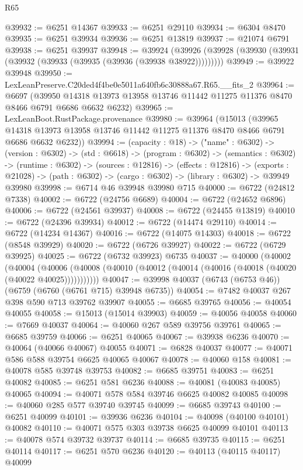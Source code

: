 \begin{lexlean}{R65}
\begin{coremodule}
{@39932 := @6251 @14367
@39933 := @6251 @29110
@39934 := @6304 @8470
@39935 := @6251 @39934
@39936 := @6251 @13819
@39937 := @21074 @6791
@39938 := @6251 @39937
@39948 := @39924
    (@39926 (@39928 (@39930 (@39931 (@39932 (@39933 (@39935 (@39936 (@39938 @38922)))))))))
@39949 := @39922 @39948
@39950 := LexLeanPreserve.C20ded4f4be0e5011a640fb6c30888a67.R65.__fits_2
@39964 := @6697
    (@39950 @14318 @13973 @13958 @13746 @11442 @11275 @11376 @8470 @8466 @6791 @6686 @6632 @6232)
@39965 := LexLeanBoot.RustPackage.provenance
@39980 := @39964
    (@15013
      (@39965 @14318 @13973 @13958 @13746 @11442 @11275 @11376 @8470 @8466 @6791 @6686 @6632 @6232))
@39994 := (capacity : @18) ->
  ("name" : @6302) ->
  (version : @6302) ->
  (std : @6618) ->
  (program : @6302) ->
  (semantics : @6302) ->
  (runtime : @6302) ->
  (sources : @12816) ->
  (effects : @12816) ->
  (exports : @21028) -> (path : @6302) -> (cargo : @6302) -> (library : @6302) -> @39949 @39980
@39998 := @6714 @46 @39948 @39980 @715
@40000 := @6722 (@24812 @7338)
@40002 := @6722 (@24756 @6689)
@40004 := @6722 (@24652 @6896)
@40006 := @6722 (@24561 @39937)
@40008 := @6722 (@24455 @13819)
@40010 := @6722 (@24396 @39934)
@40012 := @6722 (@14474 @29110)
@40014 := @6722 (@14234 @14367)
@40016 := @6722 (@14075 @14303)
@40018 := @6722 (@8548 @39929)
@40020 := @6722 (@6726 @39927)
@40022 := @6722 (@6729 @39925)
@40025 := @6722 (@6732 @39923) @6735
@40037 := @40000
    (@40002
      (@40004
        (@40006 (@40008 (@40010 (@40012 (@40014 (@40016 (@40018 (@40020 (@40022 @40025)))))))))))
@40047 := @39998 @40037 (@6743 (@6753 @46)) (@6759 (@6760 (@6761 @715) @39948 @6735))
@40054 := @7482 @40037 @267 @398 @590 @713 @39762 @39907
@40055 := @6685 @39765
@40056 := @40054 @40055
@40058 := @15013 (@15014 @39903)
@40059 := @40056 @40058
@40060 := @7669 @40037
@40064 := @40060 @267 @589 @39756 @39761
@40065 := @6685 @39759
@40066 := @6251 @40065
@40067 := @39938 @6236
@40070 := @40064 (@40066 @40067) @40055
@40071 := @6828 @40037
@40077 := @40071 @586 @588 @39754 @6625 @40065 @40067
@40078 := @40060 @158
@40081 := @40078 @585 @39748 @39753
@40082 := @6685 @39751
@40083 := @6251 @40082
@40085 := @6251 @581 @6236
@40088 := @40081 (@40083 @40085) @40065
@40094 := @40071 @578 @584 @39746 @6625 @40082 @40085
@40098 := @40060 @285 @577 @39740 @39745
@40099 := @6685 @39743
@40100 := @6251 @40099
@40101 := @39936 @6236
@40104 := @40098 (@40100 @40101) @40082
@40110 := @40071 @575 @303 @39738 @6625 @40099 @40101
@40113 := @40078 @574 @39732 @39737
@40114 := @6685 @39735
@40115 := @6251 @40114
@40117 := @6251 @570 @6236
@40120 := @40113 (@40115 @40117) @40099
}
\end{coremodule}
\end{lexlean}
